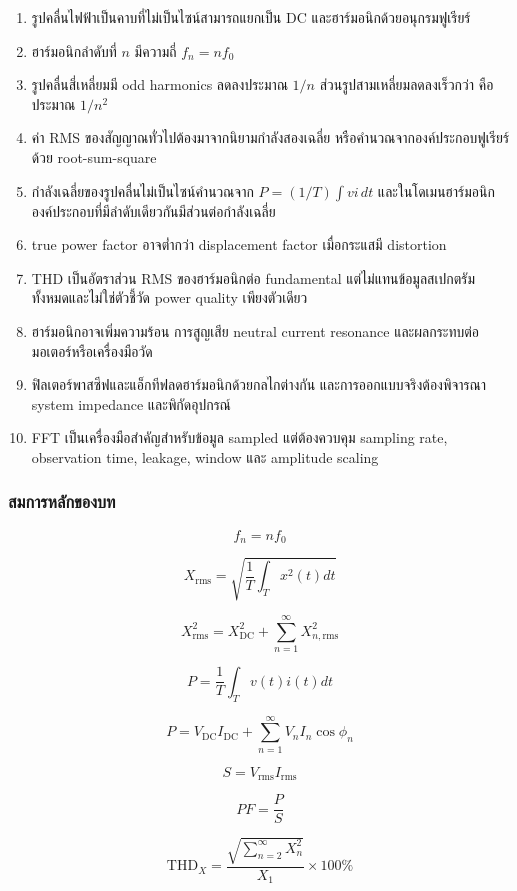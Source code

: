 \begin{enumerate}
    \item รูปคลื่นไฟฟ้าเป็นคาบที่ไม่เป็นไซน์สามารถแยกเป็น DC และฮาร์มอนิกด้วยอนุกรมฟูเรียร์
    \item ฮาร์มอนิกลำดับที่ $n$ มีความถี่ $f_n=nf_0$
    \item รูปคลื่นสี่เหลี่ยมมี odd harmonics ลดลงประมาณ $1/n$ ส่วนรูปสามเหลี่ยมลดลงเร็วกว่า คือประมาณ $1/n^2$
    \item ค่า RMS ของสัญญาณทั่วไปต้องมาจากนิยามกำลังสองเฉลี่ย หรือคำนวณจากองค์ประกอบฟูเรียร์ด้วย root-sum-square
    \item กำลังเฉลี่ยของรูปคลื่นไม่เป็นไซน์คำนวณจาก $P=(1/T)\int vi\,dt$ และในโดเมนฮาร์มอนิก องค์ประกอบที่มีลำดับเดียวกันมีส่วนต่อกำลังเฉลี่ย
    \item true power factor อาจต่ำกว่า displacement factor เมื่อกระแสมี distortion
    \item THD เป็นอัตราส่วน RMS ของฮาร์มอนิกต่อ fundamental แต่ไม่แทนข้อมูลสเปกตรัมทั้งหมดและไม่ใช่ตัวชี้วัด power quality เพียงตัวเดียว
    \item ฮาร์มอนิกอาจเพิ่มความร้อน การสูญเสีย neutral current resonance และผลกระทบต่อมอเตอร์หรือเครื่องมือวัด
    \item ฟิลเตอร์พาสซีฟและแอ็กทีฟลดฮาร์มอนิกด้วยกลไกต่างกัน และการออกแบบจริงต้องพิจารณา system impedance และพิกัดอุปกรณ์
    \item FFT เป็นเครื่องมือสำคัญสำหรับข้อมูล sampled แต่ต้องควบคุม sampling rate, observation time, leakage, window และ amplitude scaling
\end{enumerate}

\subsubsection{สมการหลักของบท}

\[
f_n=nf_0
\]

\[
X_{\mathrm{rms}}=\sqrt{\frac{1}{T}\int_T x^2(t)dt}
\]

\[
X_{\mathrm{rms}}^2=X_{\mathrm{DC}}^2+\sum_{n=1}^{\infty}X_{n,\mathrm{rms}}^2
\]

\[
P=\frac{1}{T}\int_T v(t)i(t)dt
\]

\[
P=V_{\mathrm{DC}}I_{\mathrm{DC}}+\sum_{n=1}^{\infty}V_nI_n\cos\phi_n
\]

\[
S=V_{\mathrm{rms}}I_{\mathrm{rms}}
\]

\[
PF=\frac{P}{S}
\]

\[
\mathrm{THD}_X=\frac{\sqrt{\sum_{n=2}^{\infty}X_n^2}}{X_1}\times100\%
\]

